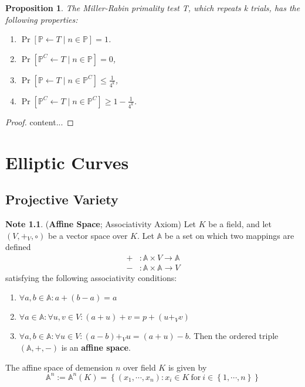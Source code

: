 \documentclass[12pt,openany]{book}
\newtheorem{proposition}[theorem]{Proposition}
\theoremstyle{definition}
\newtheorem*{note}{Note}
\newcommand{\set}[1]{\left\{#1\right\}}
\newcommand{\of}[1]{\left( #1 \right)}
\begin{document}
	\begin{tcolorbox}[colback=white,colframe=procolor,arc=5pt,title={\color{white}\bf }]
		\begin{proposition}
			The Miller-Rabin primality test T, which repeats k trials, has the following properties:
			\begin{enumerate}[(1)]
				\item $\Pr[\mathbb{P}\gets T\mid n\in\mathbb{P}]=1$.
				\item $\Pr[\mathbb{P}^C\gets T\mid n\in\mathbb{P}]=0$,
				\item $\Pr[\mathbb{P}\gets T\mid n\in\mathbb{P}^C]\leq\displaystyle\frac{1}{4^k}$,
				\item $\Pr[\mathbb{P}^C\gets T\mid n\in\mathbb{P}^C]\geq\displaystyle 1-\frac{1}{4^k}$.
			\end{enumerate}
		\end{proposition}
	\end{tcolorbox}
	\begin{proof}
		content...
	\end{proof}

	
	\newpage
	\chapter{Elliptic Curves}
	
	\section{Projective Variety}
	
	\begin{note}{(\textbf{Affine Space}; Associativity Axiom)}
		Let $K$ be a field, and let $\of{V,+_V,\circ}$ be a vector space over $K$. Let $\mathbb{A}$ be a set on which two mappings are defined \begin{align*}
		+&:\mathbb{A}\times V\to\mathbb{A}\\
		-&:\mathbb{A}\times\mathbb{A}\to V
		\end{align*} satisfying the following associativity conditions: \begin{enumerate}[(\text{A}1)]
			\item $\forall a,b\in\mathbb{A}:a+(b-a)=a$
			\item $\forall a\in\mathbb{A}:\forall u,v\in V:(a+u)+v=p+(u+_V v)$
			\item $\forall a,b\in\mathbb{A}:\forall u\in V:(a-b)+_V u=(a+u)-b$. Then the ordered triple $(\mathbb{A},+,-)$ is an \textbf{affine space}.
		\end{enumerate} The affine space of demension $n$ over field $K$ is given by \[
		\mathbb{A}^n:=\mathbb{A}^n(K)=\set{(x_1,\cdots,x_n):x_i\in K\ \text{for}\ i\in\set{1,\cdots,n}}
		\]
	\end{note}
	\vspace{8pt}
\end{document}
